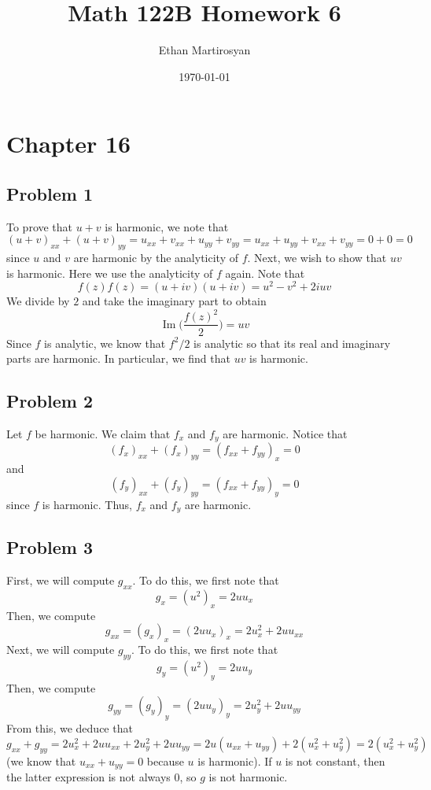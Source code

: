 \documentclass[12pt]{article}
\DeclareMathOperator{\imag}{Im}
\begin{document}
 
\title{Math 122B Homework 6}
\author{Ethan Martirosyan}
\date{\today}
\maketitle
{}
\hfuzz=50pt
\section*{Chapter 16}
\subsection*{Problem 1}
To prove that $u+v$ is harmonic, we note that
\[
(u+v)_{xx} + (u+v)_{yy} = u_{xx} +v_{xx} + u_{yy} + v_{yy} = u_{xx} + u_{yy} + v_{xx} + v_{yy} = 0 + 0 = 0
\] since $u$ and $v$ are harmonic by the analyticity of $f$. Next, we wish to show that $uv$ is harmonic. Here we use the analyticity of $f$ again. Note that
\[
f(z)f(z) = (u + iv)(u+iv) = u^2 - v^2 + 2iuv
\] We divide by $2$ and take the imaginary part to obtain
\[
\imag\bigg(\frac{f(z)^2}{2}\bigg) = uv
\] Since $f$ is analytic, we know that $f^2/2$ is analytic so that its real and imaginary parts are harmonic. In particular, we find that $uv$ is harmonic.
\newpage
\subsection*{Problem 2}
Let $f$ be harmonic. We claim that $f_x$ and $f_y$ are harmonic. Notice that
\[
(f_{x})_{xx} + (f_x)_{yy} = (f_{xx} + f_{yy})_x = 0 
\] and
\[
(f_y)_{xx} + (f_y)_{yy} = (f_{xx} + f_{yy})_y = 0
\] since $f$ is harmonic. Thus, $f_x$ and $f_y$ are harmonic.
\newpage
\subsection*{Problem 3}
First, we will compute $g_{xx}$. To do this, we first note that
\[
g_x = (u^2)_x = 2u u_x
\] Then, we compute
\[
g_{xx} = (g_x)_x = (2uu_x)_x = 2u_x^2 + 2uu_{xx}
\] Next, we will compute $g_{yy}$. To do this, we first note that
\[
g_y = (u^2)_y = 2u u_y
\] Then, we compute
\[
g_{yy} = (g_{y})_y = (2u u_y)_y = 2u_y^2 + 2uu_{yy}
\] From this, we deduce that
\[
g_{xx} + g_{yy} = 2u_x^2 + 2uu_{xx} + 2u_y^2 + 2uu_{yy} = 2u(u_{xx}+u_{yy})  + 2(u_x^2+u_y^2) = 2(u_x^2+u_y^2)
\] (we know that $u_{xx} + u_{yy} = 0$ because $u$ is harmonic). If $u$ is not constant, then the latter expression is not always $0$, so $g$ is not harmonic.
\newpage
\end{document}
